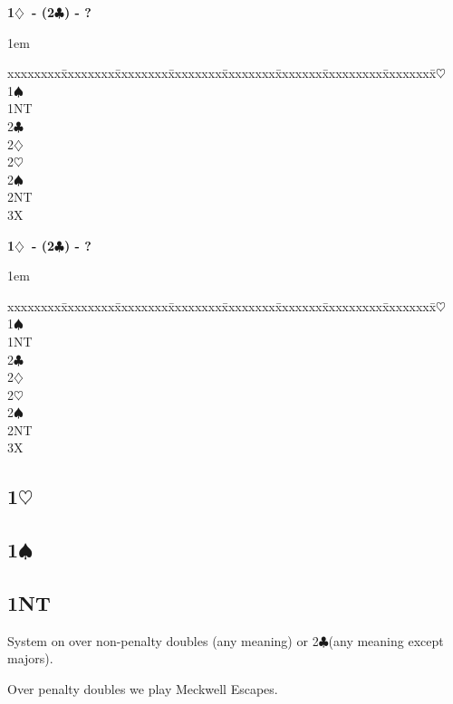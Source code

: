 \documentclass[10pt]{article}
\renewcommand{\c}{$\clubsuit$}
\renewcommand{\d}{$\diamondsuit$}
\newcommand{\h}{$\heartsuit$}
\newcommand{\s}{$\spadesuit$}
\newenvironment{bidtable}[1][]
{\textbf{#1}
  \begin{adjustwidth}{1em}{}
    \addvspace{2pt}
    \begin{tabbing}
      xxxxxxxx\=xxxxxxxx\=xxxxxxxx\=xxxxxxxx\=xxxxxxxx\=xxxxxxx\=xxxxxxxxx\=xxxxxxxx\=\kill}
{\end{tabbing}\end{adjustwidth}\bigskip}%
\newcommand{\pdfh}{\texorpdfstring{\h{}}{H}}
\newcommand{\pdfs}{\texorpdfstring{\s{}}{S}}
\begin{document}
\begin{bidtable}[1\d\ - (2\c) - ?]
1\h \>                                \\
1\s \>                                \\
1NT \>                                \\
2\c \>                                \\
2\d \>                                \\
2\h \>                                \\
2\s \>                                \\
2NT \>                                \\
3X  \>                                \\
\end{bidtable}
\begin{bidtable}[1\d\ - (2\c) - ?]
1\h \>                                \\
1\s \>                                \\
1NT \>                                \\
2\c \>                                \\
2\d \>                                \\
2\h \>                                \\
2\s \>                                \\
2NT \>                                \\
3X  \>                                \\
\end{bidtable}
\subsection{1\pdfh}
\subsection{1\pdfs}
\subsection{1NT}

System on over non-penalty doubles (any meaning) or 2\c (any meaning except majors).

Over penalty doubles we play Meckwell Escapes.
\end{document}
